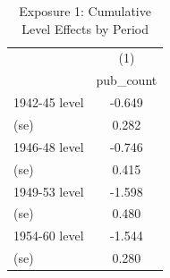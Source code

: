 \begin{table}[htbp]\centering
\def\sym#1{\ifmmode^{#1}\else\(^{#1}\)\fi}
\caption{Exposure 1: Cumulative Level Effects by Period}
\begin{tabular}{l*{1}{c}}
\hline\hline
            &\multicolumn{1}{c}{(1)}\\
            &\multicolumn{1}{c}{pub\_count}\\
\hline
1942-45 level&      -0.649\\
  (se)      &       0.282\\
1946-48 level&      -0.746\\
  (se)      &       0.415\\
1949-53 level&      -1.598\\
  (se)      &       0.480\\
1954-60 level&      -1.544\\
  (se)      &       0.280\\
\hline\hline
\end{tabular}
\end{table}
